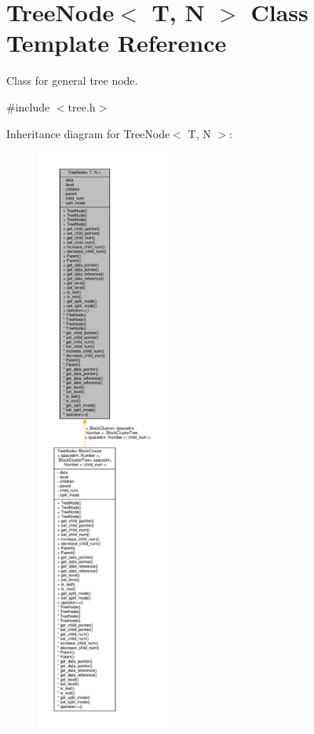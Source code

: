 \hypertarget{classTreeNode}{}\section{Tree\+Node$<$ T, N $>$ Class Template Reference}
\label{classTreeNode}


Class for general tree node.  




{\ttfamily \#include $<$tree.\+h$>$}



Inheritance diagram for Tree\+Node$<$ T, N $>$\+:\nopagebreak
\begin{figure}[H]
\begin{center}
\leavevmode
\includegraphics[height=550pt]{classTreeNode__inherit__graph}
\end{center}
\end{figure}


